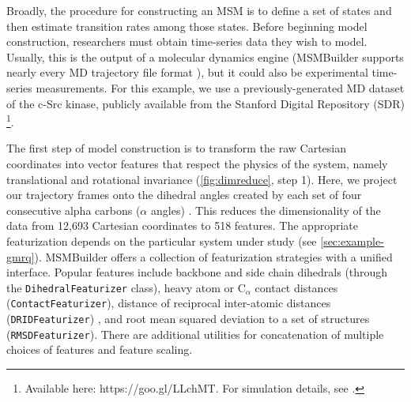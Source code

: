 Broadly, the procedure for constructing an MSM is to define a set of states
and then estimate transition rates among those states.  Before beginning
model construction, researchers must obtain time-series data they wish to
model.  Usually, this is the output of a molecular dynamics engine
(MSMBuilder supports nearly every MD trajectory file format \cite{2015-mdtraj}), 
but it
could also be experimental time-series measurements. For this example, we
use a previously-generated MD dataset of the c-Src kinase, publicly
available from the Stanford Digital Repository (SDR) \footnote{Available here:
https://goo.gl/LLchMT.  For simulation details, see
\citet{Shukla_NatCommun14}.}. 

The first step of model construction is to transform the raw Cartesian
coordinates into vector features that respect the physics of the system,
namely translational and rotational invariance (\cref{fig:dimreduce}, step
1).  Here, we project our trajectory frames onto the dihedral angles
created by each set of four consecutive alpha carbons ($\alpha$ angles)
\cite{Flocco_ProteinSci95}.  This reduces the dimensionality of the data
from 12,693 Cartesian coordinates to 518 features.  The appropriate
featurization depends on the particular system under study (see \cref{sec:example-gmrq}). MSMBuilder
offers a collection of featurization strategies with a unified interface.
Popular features include backbone and side chain dihedrals (through the
\texttt{DihedralFeaturizer} class), heavy atom or  C$_\alpha$ contact
distances (\texttt{ContactFeaturizer}), distance of reciprocal inter-atomic
distances (\texttt{DRIDFeaturizer}) \cite{2012-drid}, and root mean squared
deviation to a set of structures (\texttt{RMSDFeaturizer}). There are
additional utilities for concatenation of multiple choices of features and
feature scaling.

